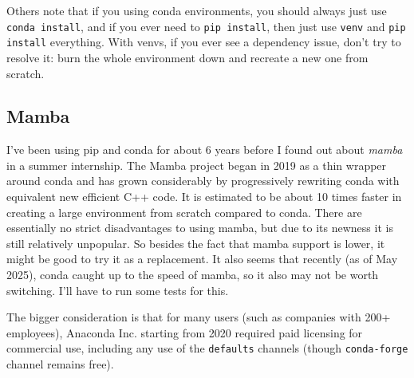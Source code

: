 \documentclass{article}
\begin{document}
    Others note that if you using conda environments, you should always just use \texttt{conda install}, and if you ever need to \texttt{pip install}, then just use \texttt{venv} and \texttt{pip install} everything. With venvs, if you ever see a dependency issue, don't try to resolve it: burn the whole environment down and recreate a new one from scratch. 

  \subsection{Mamba} 

    I've been using pip and conda for about 6 years before I found out about \textit{mamba} in a summer internship. The Mamba project began in 2019 as a thin wrapper around conda and has grown considerably by progressively rewriting conda with equivalent new efficient C++ code. It is estimated to be about 10 times faster in creating a large environment from scratch compared to conda. There are essentially no strict disadvantages to using mamba, but due to its newness it is still relatively unpopular. So besides the fact that mamba support is lower, it might be good to try it as a replacement. It also seems that recently (as of May 2025), conda caught up to the speed of mamba, so it also may not be worth switching. I'll have to run some tests for this. 

    The bigger consideration is that for many users (such as companies with 200+ employees), Anaconda Inc. starting from 2020 required paid licensing for commercial use, including any use of the \texttt{defaults} channels (though \texttt{conda-forge} channel remains free). 
\end{document}
